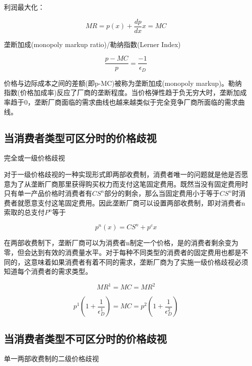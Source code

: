 \documentclass{article}
\begin{document}
\hspace*{\fill}

利润最大化：

\[
MR=p(x)+\frac{dp}{dx}x=MC
\]

\hspace*{\fill}

垄断加成(monopoly markup ratio)/勒纳指数(Lerner Index)

\[
\frac{p-MC}{p}=\frac{-1}{\epsilon_D}
\]

价格与边际成本之间的差额(即p-MC)被称为垄断加成(monopoly markup)。勒纳指数(价格加成率)反应了厂商的垄断程度。当价格弹性趋于负无穷大时，垄断加成率趋于0，垄断厂商面临的需求曲线也越来越类似于完全竞争厂商所面临的需求曲线。

\hspace*{\fill}

\subsection{当消费者类型可区分时的价格歧视
}

完全或一级价格歧视

对于一级价格歧视的一种实现形式即两部收费制，消费者唯一的问题就是他是否愿意为了从垄断厂商那里获得购买权力而支付这笔固定费用。既然当没有固定费用时只有单一产品价格时消费者有$ CS^n $部分的剩余，那么当固定费用小于等于$ CS^n $时消费者就愿意支付这笔固定费用。因此垄断厂商可以设置两部收费制，即对消费者n索取的总支付$ P^n $等于

\[
p^n(x)=CS^n+p^cx
\]

在两部收费制下，垄断厂商可以为消费者n制定一个价格，是的消费者剩余变为零，但会达到有效的消费量水平。对于每种不同类型的消费者的固定费用也都是不同的，这意味着如果消费者有着不同的需求，垄断厂商为了实施一级价格歧视必须知道每个消费者的需求类型。

\[
MR^1=MC=MR^2
\]

\[
p^1(1+\frac{1}{\epsilon_D^1})=MC=p^2(1+\frac{1}{\epsilon_D^2})
\]

\subsection{当消费者类型不可区分时的价格歧视
}

单一两部收费制的二级价格歧视
\end{document}
